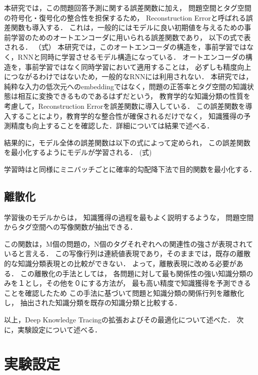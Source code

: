 本研究では，この問題回答予測に関する誤差関数に加え，
問題空間とタグ空間の符号化・復号化の整合性を担保するため，
Reconstruction Errorと呼ばれる誤差関数も導入する．
これは，一般的にはモデルに良い初期値を与えるための事前学習のためのオートエンコーダに用いられる誤差関数であり，
以下の式で表される．
（式）
本研究では，このオートエンコーダの構造を，事前学習ではなく，RNNと同時に学習させるモデル構造になっている．
オートエンコーダの構造を，事前学習ではなく同時学習において適用することは，
必ずしも精度向上につながるわけではないため，一般的なRNNには利用されない．
本研究では，純粋な入力の低次元へのembeddingではなく，問題の正答率とタグ空間の知識状態は相互に変換できるものであるはずだという，
教育学的な知識分類の性質を考慮して，Reconstruction Errorを誤差関数に導入している．
この誤差関数を導入することにより，教育学的な整合性が確保されるだけでなく，
知識獲得の予測精度も向上することを確認した．詳細については結果で述べる．

結果的に，モデル全体の誤差関数は以下の式によって定められ，
この誤差関数を最小化するようにモデルが学習される．
(式)



学習時は\cite{piech2015deep}と同様にミニバッチごとに確率的勾配降下法で目的関数を最小化する．



\subsection{離散化}
学習後のモデルからは，
知識獲得の過程を最もよく説明するような，
問題空間からタグ空間への写像関数が抽出できる．

この関数は，M個の問題の，N個のタグそれぞれへの関連性の強さが表現されていると言える．
この写像行列は連続値表現であり，そのままでは，既存の離散的な知識分類表現との比較ができない．
よって，離散表現に改める必要がある．
この離散化の手法としては，
各問題に対して最も関係性の強い知識分類のみを１とし，その他を０にする方法が，
最も高い精度で知識獲得を予測できることを確認したため
この手法に基づいて問題と知識分類の関係行列を離散化し，
抽出された知識分類を既存の知識分類と比較する．



以上，Deep Knowledge Tracingの拡張およびその最適化について述べた．
次に，実験設定について述べる．




\section{実験設定}

